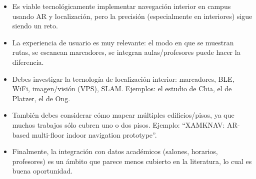 \begin{itemize}
	
	\item Es viable tecnológicamente implementar navegación interior en campus usando AR y localización, pero la precisión (especialmente en interiores) sigue siendo un reto.
	
	\item La experiencia de usuario es muy relevante: el modo en que se muestran rutas, se escanean marcadores, se integran aulas/profesores puede hacer la diferencia.
	
	\item Debes investigar la tecnología de localización interior: marcadores, BLE, WiFi, imagen/visión (VPS), SLAM. Ejemplos: el estudio de Chia, el de Platzer, el de Ong.
	
	\item También debes considerar cómo mapear múltiples edificios/pisos, ya que muchos trabajos sólo cubren uno o dos pisos. Ejemplo: “XAMKNAV: AR-based multi-floor indoor navigation prototype”.
	
	\item Finalmente, la integración con datos académicos (salones, horarios, profesores) es un ámbito que parece menos cubierto en la literatura, lo cual es buena oportunidad.
	
\end{itemize}

\newpage
